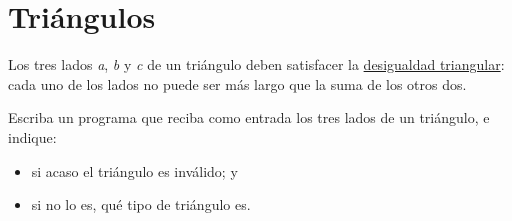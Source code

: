 \section{Triángulos}

Los tres lados \emph{a}, \emph{b} y \emph{c} de un triángulo deben
satisfacer la
\href{http://es.wikipedia.org/wiki/Desigualdad\_triangular}{desigualdad
triangular}: cada uno de los lados no puede ser más largo que la suma de
los otros dos.

Escriba un programa que reciba como entrada los tres lados de un
triángulo, e indique:

\begin{itemize}
\item
  si acaso el triángulo es inválido; y
\item
  si no lo es, qué tipo de triángulo es.
\end{itemize}
